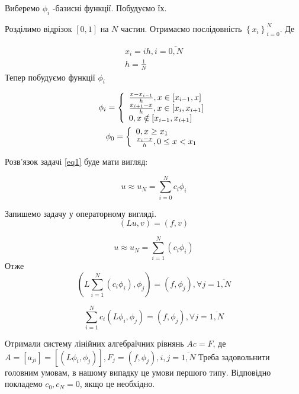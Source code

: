 \documentclass[14pt,a4paper]{scrartcl}
\begin{document}
	Виберемо $\phi_i$ -базисні функції. Побудуємо їх.
	
	Розділимо відрізок $[0,1]$ на $N$ частин. Отримаємо послідовність $\left\{ x_{i}\right\}_{i=0}^{N}$. Де
	
	\begin{gather} \label{eq3}
	x_{i} = ih, i= \overline{0,N} \\
	h = \frac{1}{N}
	\end{gather}
	Тепер побудуємо функції $\phi_i$
	
	\begin{gather} \label{eq4}
	\phi_{i} = \left\{
	\begin{array}
	[c]{ll}%
	\frac{x-x_{i-1}}{h}, x \in [x_{i-1}, x] \\
	\frac{x_{i+1}-x}{h}, x \in [x_{i}, x_{i+1}]\\			
	0, x \notin [x_{i-1}, x_{i+1}] 
	\end{array} \right.
	\\
	\phi_{0} = \left\{
	\begin{array}
	[c]{ll}%
	0, x \geq x_1 \\
	\frac{x_{i}-x}{h}, 0 \leq x < x_1
	\end{array}  \right.
	\end{gather}
	
	 Розв'язок  задачі \ref{eq1} буде мати вигляд:
	
	\begin{equation} \label{eq2}
	u \approx u_N = \sum_{i=0}^{N}c_{i}\phi_{i}
	\end{equation}
	
	
	Запишемо задачу у операторному вигляді. 
	\begin{equation} \label{eq6}
	\left(Lu,v\right) = \left(f,v\right)
	\end{equation}
	
	\begin{equation} \label{eq7}
	u \approx u_N = \sum_{i=1}^{N}(c_{i}\phi_{i})
	\end{equation}
	Отже
	\begin{equation} \label{eq8}
	\left(L \sum_{i=1}^{N}(c_i \phi_i), \phi_j\right) = \left(f,\phi_j\right), \forall j= \overline{1,N}
	\end{equation}
	
	\begin{equation} \label{eq9}
	\sum_{i=1}^{N}c_i\left(L\phi_i, \phi_j\right) = \left(f,\phi_j\right), \forall j= \overline{1,N}
	\end{equation}
	
	Отримали систему лінійних алгебраїчних рівнянь $Ac=F$, де $A = [a_{ji}]= \left[\left(L\phi_i,\phi_j\right)\right], F_{j}=\left(f,\phi_j\right), i,j=\overline{1,N}$
	Треба задовольнити головним умовам, в нашому випадку це умови першого типу. Відповідно покладемо $c_0 ,c_N =0$, якщо це необхідно.
	
\end{document}

